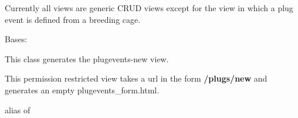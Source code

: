 \documentclass[letterpaper,10pt,english]{sphinxmanual}
\begin{document}
Currently all views are generic CRUD views except for the view in which a plug event is defined from a breeding cage.

\begin{fulllineitems}
\label{api:mousedb.timed_mating.views.PlugEventsCreate}
Bases: {\hyperref[api:mousedb.views.RestrictedCreateView]{}}

This class generates the plugevents-new view.

This permission restricted view takes a url in the form \textbf{/plugs/new} and generates an empty plugevents\_form.html.

\begin{fulllineitems}
\label{api:mousedb.timed_mating.views.PlugEventsCreate.model}
alias of 

\end{fulllineitems}


\begin{fulllineitems}
\label{api:mousedb.timed_mating.views.PlugEventsCreate.template_name}
\end{fulllineitems}


\end{fulllineitems}

\end{document}
